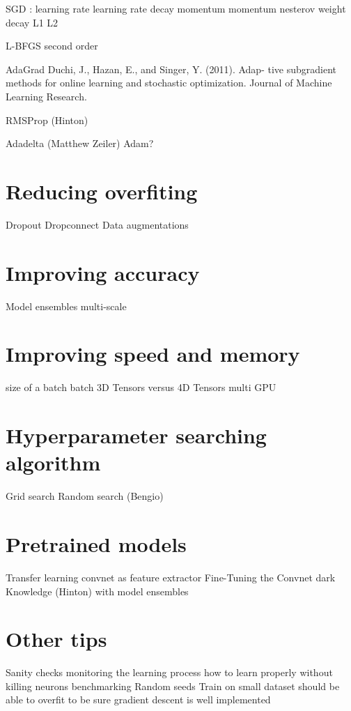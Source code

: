 SGD :
learning rate
learning rate decay
momentum
momentum nesterov
weight decay L1 L2

L-BFGS
second order

AdaGrad
Duchi, J., Hazan, E., and Singer, Y. (2011). Adap- tive subgradient methods for online learning and stochastic optimization. Journal of Machine Learning Research.


RMSProp (Hinton)

Adadelta (Matthew Zeiler)
Adam?



\section{Reducing overfiting}
Dropout
Dropconnect
Data augmentations

\section{Improving accuracy}
Model ensembles
multi-scale

\section{Improving speed and memory}
size of a batch
batch 3D Tensors versus 4D Tensors
multi GPU

\section{Hyperparameter searching algorithm}
Grid search
Random search (Bengio)

\section{Pretrained models}
Transfer learning
convnet as feature extractor
Fine-Tuning the Convnet
dark Knowledge (Hinton) with model ensembles
    
\section{Other tips}
Sanity checks
monitoring the learning process
how to learn properly without killing neurons
benchmarking
Random seeds
Train on small dataset should be able to overfit to be sure gradient descent is well implemented 

